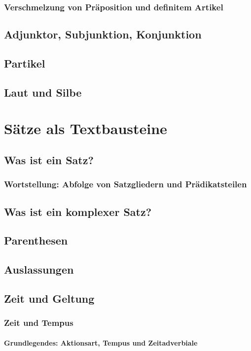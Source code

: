 \documentclass{report}
\begin{document}
		\subsection{Verschmelzung von Präposition und definitem Artikel}
	\section{Adjunktor, Subjunktion, Konjunktion}
	\section{Partikel}
	\section{Laut und Silbe}

\chapter{Sätze als Textbausteine}

	\section{Was ist ein Satz?}
		\subsection{Wortstellung: Abfolge von Satzgliedern und Prädikatsteilen}
		
	\section{Was ist ein komplexer Satz?}
	\section{Parenthesen}
	\section{Auslassungen}
	\section{Zeit und Geltung}
		\subsection{Zeit und Tempus}
			\subsubsection{Grundlegendes: Aktionsart, Tempus und Zeitadverbiale}
\end{document}
